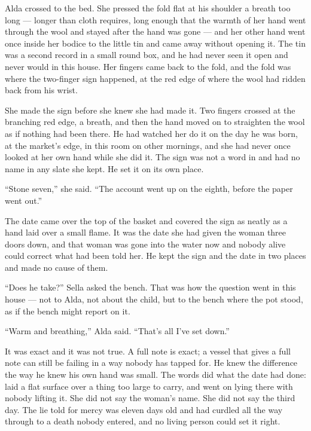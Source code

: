 Alda crossed to the bed. She pressed the fold flat at his shoulder a breath too long --- longer than cloth requires, long enough that the warmth of her hand went through the wool and stayed after the hand was gone --- and her other hand went once inside her bodice to the little tin and came away without opening it. The tin was a second record in a small round box, and he had never seen it open and never would in this house. Her fingers came back to the fold, and the fold was where the two-finger sign happened, at the red edge of  where the wool had ridden back from his wrist.

She made the sign before she knew she had made it. Two fingers crossed at the branching red edge, a breath, and then the hand moved on to straighten the wool as if nothing had been there. He had watched her do it on the day he was born, at the market's edge, in this room on other mornings, and she had never once looked at her own hand while she did it. The sign was not a word in  and had no name in any slate she kept. He set it on its own place.

“Stone seven,” she said. “The account went up on the eighth, before the paper went out.”

The date came over the top of the basket and covered the sign as neatly as a hand laid over a small flame. It was the date she had given the woman three doors down, and that woman was gone into the water now and nobody alive could correct what had been told her. He kept the sign and the date in two places and made no cause of them.

\scenebreak

“Does he take?” Sella asked the bench. That was how the question went in this house --- not to Alda, not about the child, but to the bench where the pot stood, as if the bench might report on it.

“Warm and breathing,” Alda said. “That's all I've set down.”

It was exact and it was not true. A full note is exact; a vessel that gives a full note can still be failing in a way nobody has tapped for. He knew the difference the way he knew his own hand was small. The words did what the date had done: laid a flat surface over a thing too large to carry, and went on lying there with nobody lifting it. She did not say the woman's name. She did not say the third day. The lie told for mercy was eleven days old and had curdled all the way through to a death nobody entered, and no living person could set it right.

